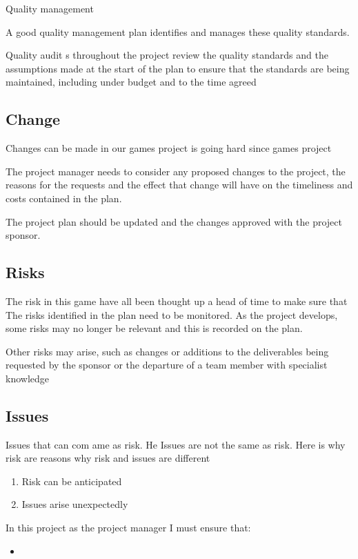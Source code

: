 \documentclass{article}
\begin{document}
Quality management

A good quality management plan identifies and manages these quality standards.

Quality audit s throughout the project review the quality standards and the assumptions made at the start of the plan to ensure that the standards are being maintained, including under budget and to the time agreed


\subsection{Change}
Changes can be made in our games project is going hard since games project  

The project manager needs to consider any proposed changes to the project, the reasons for the requests and the effect that change will have on the timeliness and costs contained in the plan.

The project plan should be updated and the changes approved with the project sponsor.

\subsection{Risks}
The risk in this game have all been thought up a head of time to make sure that 
The risks identified in the plan need to be monitored. As the project develops, some risks may no longer be relevant and this is recorded on the plan. 

Other risks may arise, such as changes or additions to the deliverables being requested by the sponsor or the departure of a team member with specialist knowledge

\subsection{Issues}
Issues that can com ame as risk. He
Issues are not the same as risk. Here is why risk are reasons why risk and issues are different
\begin{enumerate}
	\item Risk can be anticipated
	\item Issues arise unexpectedly
\end{enumerate}

In this project as the project manager I must ensure that:
\begin{itemize}
	\item
\end{itemize}
\end{document}
